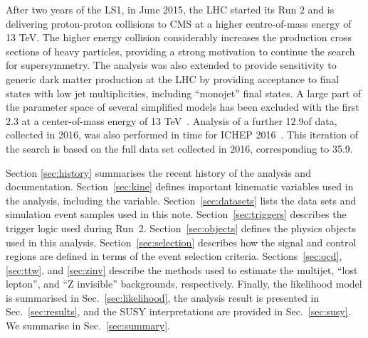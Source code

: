 After two years of the LS1, in June 2015, the LHC started its Run 2
and is delivering proton-proton collisions to CMS at a higher
centre-of-mass energy of 13 TeV. The higher energy collision
considerably increases the production cross sections of heavy
particles, providing a strong motivation to continue the search for
supersymmetry. The analysis was also extended to provide sensitivity
to generic dark matter production at the LHC by providing acceptance
to final states with low jet multiplicities, including ``monojet''
final states. A large part of the parameter space of several
simplified models has been excluded with the first 2.3 \ifb at a
center-of-mass energy of 13 TeV~\cite{Khachatryan:2016dvc}. Analysis
of a further 12.9\fbinv of data, collected in 2016, was also performed
in time for ICHEP 2016~\cite{CMS-PAS-SUS-16-016}. This iteration of
the search is based on the full data set collected in 2016,
corresponding to 35.9\fbinv. 

Section \ref{sec:history} summarises the recent history of the
analysis and documentation. Section~\ref{sec:kine} defines important
kinematic variables used in the analysis, including the \alphat
variable. Section~\ref{sec:datasets} lists the data sets and
simulation event samples used in this note. Section~\ref{sec:triggers}
describes the trigger logic used during
Run~2. Section~\ref{sec:objects} defines the physics objects used in
this analysis. Section~\ref{sec:selection} describes how the signal
and control regions are defined in terms of the event selection
criteria. Sections~\ref{sec:qcd}, \ref{sec:ttw}, and \ref{sec:zinv}
describe the methods used to estimate the multijet, ``lost lepton'',
and ``Z invisible'' backgrounds, respectively. Finally, the likelihood
model is summarised in Sec.~\ref{sec:likelihood}, the analysis result
is presented in Sec.~\ref{sec:results}, and the SUSY interpretations
are provided in Sec.~\ref{sec:susy}. We summarise in
Sec.~\ref{sec:summary}.

